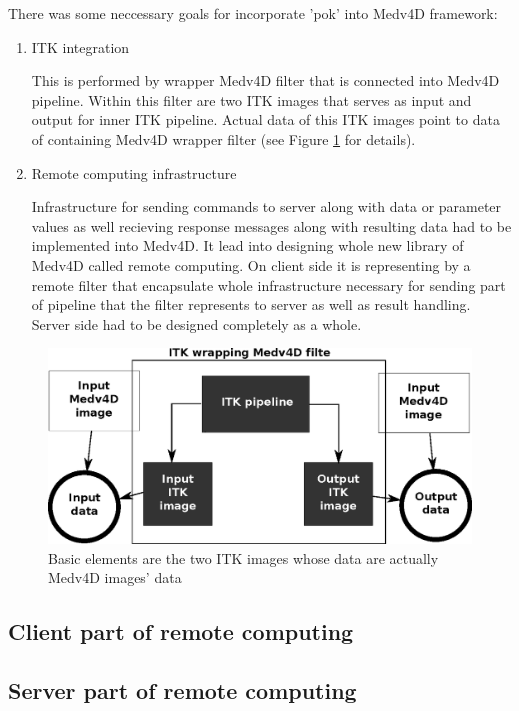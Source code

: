 \par
There was some neccessary goals for incorporate 'pok' into Medv4D framework:
\begin{enumerate}
  \item{ITK integration}
  \par
  This is performed by wrapper Medv4D filter that is connected into Medv4D pipeline. Within this filter are two ITK images that serves as input and output for inner ITK pipeline. Actual data of this ITK images point to data of containing Medv4D wrapper filter (see Figure \ref{fg:ITKWrapping} for details).

  \item{Remote computing infrastructure}
  \par
  Infrastructure for sending commands to server along with data or parameter values as well recieving response messages along with resulting data had to be implemented into Medv4D. It lead into designing whole new library of Medv4D called remote computing. On client side it is representing by a remote filter that encapsulate whole infrastructure necessary for sending part of pipeline that the filter represents to server as well as result handling. Server side had to be designed completely as a whole.
\end{enumerate}

\begin{figure}
    \centering
    \includegraphics[width=12cm]{data/ITKFilter.eps}
    \caption[ITK wrapper Medv4D filter]{Basic elements are the two ITK images whose data are actually Medv4D images' data}
    \label{fg:ITKWrapping}
\end{figure}

\subsection{Client part of remote computing}



\subsection{Server part of remote computing}
